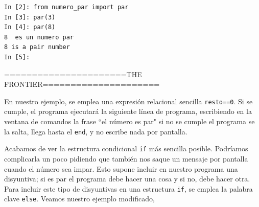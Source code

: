 \begin{center}
    \begin{minipage}{.4\textwidth}
\begin{verbatim}
In [2]: from numero_par import par
In [3]: par(3)
In [4]: par(8)
8  es un numero par
8 is a pair number
In [5]: 
\end{verbatim}
\end{minipage}
\end{center}
======================THE FRONTIER=====================
 










 



En nuestro ejemplo, se emplea una expresión relacional sencilla \texttt{resto==0}. Si se cumple, el programa ejecutará la siguiente línea de programa, escribiendo en la ventana de comandos la frase ``el número es par"  si no se cumple el programa se la salta, llega hasta el \texttt{end}, y no escribe nada por pantalla. 

Acabamos de ver la estructura condicional \texttt{if} más sencilla posible. Podríamos complicarla un poco pidiendo que también nos saque un mensaje por pantalla cuando el número sea impar. Esto supone incluir en nuestro programa una disyuntiva; si es par el programa debe hacer una cosa y si no, debe hacer otra. Para incluir este tipo de disyuntivas en una estructura \texttt{if}, se emplea la palabra clave \texttt{else}. Veamos nuestro ejemplo modificado,


